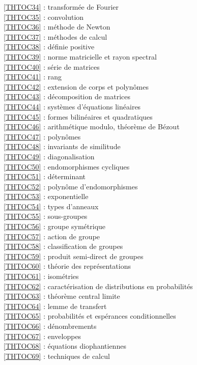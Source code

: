\ref{THTOC34} : transformée de Fourier\\
\ref{THTOC35} : convolution\\
\ref{THTOC36} : méthode de Newton\\
\ref{THTOC37} : méthodes de calcul\\
\ref{THTOC38} : définie positive\\
\ref{THTOC39} : norme matricielle et rayon spectral\\
\ref{THTOC40} : série de matrices\\
\ref{THTOC41} : rang\\
\ref{THTOC42} : extension de corps et polynômes\\
\ref{THTOC43} : décomposition de matrices\\
\ref{THTOC44} : systèmes d'équations linéaires\\
\ref{THTOC45} : formes bilinéaires et quadratiques\\
\ref{THTOC46} : arithmétique modulo, théorème de Bézout\\
\ref{THTOC47} : polynômes\\
\ref{THTOC48} : invariants de similitude\\
\ref{THTOC49} : diagonalisation\\
\ref{THTOC50} : endomorphismes cycliques\\
\ref{THTOC51} : déterminant\\
\ref{THTOC52} : polynôme d'endomorphismes\\
\ref{THTOC53} : exponentielle\\
\ref{THTOC54} : types d'anneaux\\
\ref{THTOC55} : sous-groupes\\
\ref{THTOC56} : groupe symétrique\\
\ref{THTOC57} : action de groupe\\
\ref{THTOC58} : classification de groupes\\
\ref{THTOC59} : produit semi-direct de groupes\\
\ref{THTOC60} : théorie des représentations\\
\ref{THTOC61} : isométries\\
\ref{THTOC62} : caractérisation de distributions en probabilités\\
\ref{THTOC63} : théorème central limite\\
\ref{THTOC64} : lemme de transfert\\
\ref{THTOC65} : probabilités et espérances conditionnelles\\
\ref{THTOC66} : dénombrements\\
\ref{THTOC67} : enveloppes\\
\ref{THTOC68} : équations diophantiennes\\
\ref{THTOC69} : techniques de calcul\\
